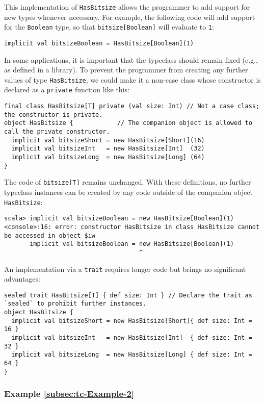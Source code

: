 This implementation of \lstinline!HasBitsize! allows the programmer
to add support for new types whenever necessary. For example, the
following code will add support for the \lstinline!Boolean! type,
so that \lstinline!bitsize[Boolean]! will evaluate to \lstinline!1!:
\begin{lstlisting}
implicit val bitsizeBoolean = HasBitsize[Boolean](1)
\end{lstlisting}
In some applications, it is important that the typeclass should remain
fixed (e.g., as defined in a library). To prevent the programmer from
creating any further values of type \lstinline!HasBitsize!, we could
make it a non-case class whose constructor is declared as a \lstinline!private!
function like this:
\begin{lstlisting}
final class HasBitsize[T] private (val size: Int) // Not a case class; the constructor is private.
object HasBitsize {            // The companion object is allowed to call the private constructor.
  implicit val bitsizeShort = new HasBitsize[Short](16)
  implicit val bitsizeInt   = new HasBitsize[Int]  (32)
  implicit val bitsizeLong  = new HasBitsize[Long] (64)
}
\end{lstlisting}
The code of \lstinline!bitsize[T]! remains unchanged. With these
definitions, no further typeclass instances can be created by any
code outside of the companion object \lstinline!HasBitsize!:
\begin{lstlisting}
scala> implicit val bitsizeBoolean = new HasBitsize[Boolean](1)
<console>:16: error: constructor HasBitsize in class HasBitsize cannot be accessed in object $iw
       implicit val bitsizeBoolean = new HasBitsize[Boolean](1)
                                     ^
\end{lstlisting}

An implementation via a \lstinline!trait! requires longer code but
brings no significant advantages:
\begin{lstlisting}
sealed trait HasBitsize[T] { def size: Int } // Declare the trait as `sealed` to prohibit further instances.
object HasBitsize {
  implicit val bitsizeShort = new HasBitsize[Short]{ def size: Int = 16 }
  implicit val bitsizeInt   = new HasBitsize[Int]  { def size: Int = 32 }
  implicit val bitsizeLong  = new HasBitsize[Long] { def size: Int = 64 }
}
\end{lstlisting}


\subsubsection{Example \label{subsec:tc-Example-2}\ref{subsec:tc-Example-2}}

